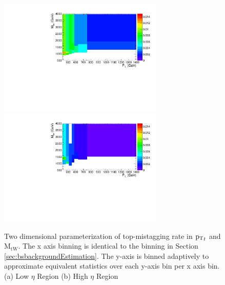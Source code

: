 \begin{figure}[htcb]
\begin{center}
\includegraphics[width=0.7\textwidth]{AN-14-049/figs/TagrateEta1SB2dSB1.pdf}\\
\includegraphics[width=0.7\textwidth]{AN-14-049/figs/TagrateEta2SB2dSB1.pdf}
\caption{
Two dimensional parameterization of top-mistagging rate in $\mathrm{p_{T}}_{t}$ and $\mathrm{M_{tW}}$.  The x axis binning is identical to the binning in Section \ref{sec:bsbackgroundEstimation}.  
The y-axis is binned adaptively to approximate equivalent statistics over each y-axis bin per x axis bin. 
(a) Low $\eta$ Region
(b) High $\eta$ Region
}
\label{figs:bssb2deta}
\end{center}
\end{figure}

